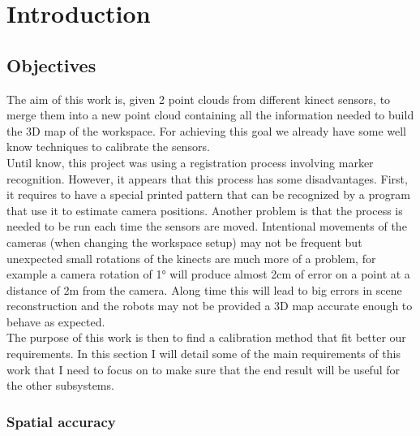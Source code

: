 
\chapter{Introduction}

\section{Objectives}

The aim of this work is, given 2 point clouds from different kinect sensors, to merge them into a new point cloud containing all the information needed to build the 3D map of the workspace. For achieving this goal we already have some well know techniques to calibrate the sensors. \\
Until know, this project was using a registration process involving marker recognition. However, it appears that this process has some disadvantages. First, it requires to have a special printed pattern that can be recognized by a program that use it to estimate camera positions. Another problem is that the process is needed to be run each time the sensors are moved. Intentional movements of the cameras (when changing the workspace setup) may not be frequent but unexpected small rotations of the kinects are much more of a problem, for example a camera rotation of 1° will produce almost 2cm of error on a point at a distance of 2m from the camera. Along time this will lead to big errors in scene reconstruction and the robots may not be provided a 3D map accurate enough to behave as expected. \\
The purpose of this work is then to find a calibration method that fit better our requirements. In this section I will detail some of the main requirements of this work that I need to focus on to make sure that the end result will be useful for the other subsystems.

\subsection{Spatial accuracy}

